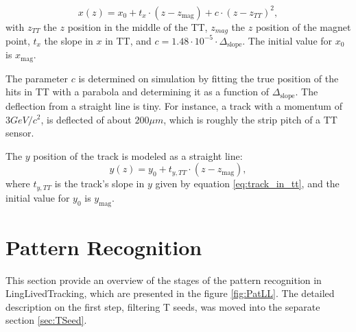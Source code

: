 \begin{equation}
\label{eq:track_in_tt}
x(z) = x_{0} + t_{x} \cdot (z - z_{\text{mag}}) +c \cdot (z - z_{TT})^{2},
\end{equation}
with $z_{TT}$ the $z$ position in the middle of the TT, $z_{mag}$ the $z$
position of the magnet point, $t_{x} $ the slope in $x$ in TT, and
$c= 1.48\cdot 10^{-5} \cdot \Delta_{\text{slope}}$. The initial value for $x_{0}$ is $x_{\text{mag}}$.
 
The parameter $c$ is determined on simulation by fitting the true position of the hits in TT with a parabola and determining it as a function of $\Delta_{\text{slope}}$. The deflection from a straight line is tiny. For instance, a track with a momentum of $3 GeV/c^{2}$, is deflected of about $200\mu m$, which is roughly the strip pitch of a TT sensor.

The $y$ position of the track is modeled as a straight line: 
\begin{equation}
y(z) = y_{0} + t_{y,TT} \cdot (z - z_{\text{mag}}),
\end{equation}
where $t_{y,TT} $ is the track's slope in $y$ given by equation \ref{eq:track_in_tt}, and  the initial value for $y_{0}$ is $y_{\text{mag}}$. 

\section{Pattern Recognition}

This section provide an overview of the stages of the pattern recognition in LingLivedTracking, which are presented in the figure \ref{fig:PatLL}. The detailed description on the first step, filtering T seeds, was moved into the separate section  \ref{sec:TSeed}. 

